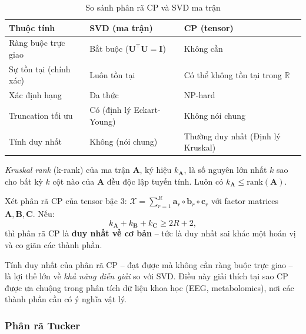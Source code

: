 \begin{table}[H]
\centering
\small
\caption{So sánh phân rã CP và SVD ma trận}
\label{tab:cp-vs-svd}
\begin{tabular}{lll}
\toprule
\textbf{Thuộc tính} & \textbf{SVD (ma trận)} & \textbf{CP (tensor)} \\
\midrule
Ràng buộc trực giao & Bắt buộc ($\mathbf{U}^\top\mathbf{U}=\mathbf{I}$) & Không cần \\
Sự tồn tại (chính xác) & Luôn tồn tại & Có thể không tồn tại trong $\mathbb{R}$ \\
Xác định hạng & Đa thức & NP-hard \\
Truncation tối ưu & Có (định lý Eckart-Young) & Không nói chung \\
Tính duy nhất & Không (nói chung) & Thường duy nhất (Định lý Kruskal) \\
\bottomrule
\end{tabular}
\end{table}

\begin{definition}
\textit{Kruskal rank} (k-rank) của ma trận $\mathbf{A}$, ký hiệu $k_{\mathbf{A}}$, là số nguyên lớn nhất $k$ sao cho bất kỳ $k$ cột nào của $\mathbf{A}$ đều độc lập tuyến tính. Luôn có $k_{\mathbf{A}} \leq \mathrm{rank}(\mathbf{A})$.
\end{definition}

\begin{theorem}
\label{thm:kruskal}
Xét phân rã CP của tensor bậc 3: $\mathcal{X} = \sum_{r=1}^R \mathbf{a}_r \circ \mathbf{b}_r \circ \mathbf{c}_r$ với factor matrices $\mathbf{A}, \mathbf{B}, \mathbf{C}$. Nếu:
\begin{equation}
    k_{\mathbf{A}} + k_{\mathbf{B}} + k_{\mathbf{C}} \geq 2R + 2,
\end{equation}
thì phân rã CP là \textbf{duy nhất về cơ bản} -- tức là duy nhất sai khác một hoán vị và co giãn các thành phần.
\end{theorem}

\begin{remark}
Tính duy nhất của phân rã CP -- đạt được mà không cần ràng buộc trực giao -- là lợi thế lớn về \textit{khả năng diễn giải} so với SVD. Điều này giải thích tại sao CP được ưa chuộng trong phân tích dữ liệu khoa học (EEG, metabolomics), nơi các thành phần cần có ý nghĩa vật lý.
\end{remark}

\subsubsection{Phân rã Tucker}

